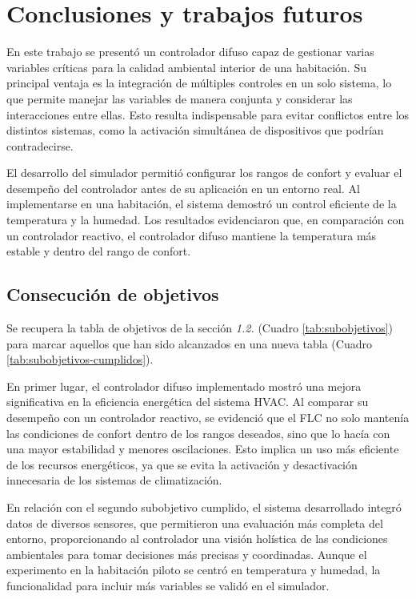 \section{Conclusiones y trabajos futuros}

En este trabajo se presentó un controlador difuso capaz de gestionar varias variables críticas para la calidad ambiental interior de una habitación. Su principal ventaja es la integración de múltiples controles en un solo sistema, lo que permite manejar las variables de manera conjunta y considerar las interacciones entre ellas. Esto resulta indispensable para evitar conflictos entre los distintos sistemas, como la activación simultánea de dispositivos que podrían contradecirse.

El desarrollo del simulador permitió configurar los rangos de confort y evaluar el desempeño del controlador antes de su aplicación en un entorno real. Al implementarse en una habitación, el sistema demostró un control eficiente de la temperatura y la humedad. Los resultados evidenciaron que, en comparación con un controlador reactivo, el controlador difuso mantiene la temperatura más estable y dentro del rango de confort.

\subsection{Consecución de objetivos}

Se recupera la tabla de objetivos de la sección \textit{1.2.} (Cuadro \ref{tab:subobjetivos}) para marcar aquellos que han sido alcanzados en una nueva tabla (Cuadro \ref{tab:subobjetivos-cumplidos}).

En primer lugar, el controlador difuso implementado mostró una mejora significativa en la eficiencia energética del sistema HVAC. Al comparar su desempeño con un controlador reactivo, se evidenció que el FLC no solo mantenía las condiciones de confort dentro de los rangos deseados, sino que lo hacía con una mayor estabilidad y menores oscilaciones. Esto implica un uso más eficiente de los recursos energéticos, ya que se evita la activación y desactivación innecesaria de los sistemas de climatización.

En relación con el segundo subobjetivo cumplido, el sistema desarrollado integró datos de diversos sensores, que permitieron una evaluación más completa del entorno, proporcionando al controlador una visión holística de las condiciones ambientales para tomar decisiones más precisas y coordinadas. Aunque el experimento en la habitación piloto se centró en temperatura y humedad, la funcionalidad para incluir más variables se validó en el simulador.

